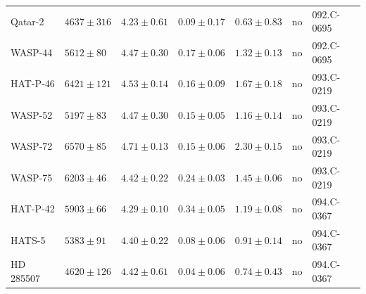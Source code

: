 \documentclass{aa}
\begin{document}
\begin{table}[htb!]
\begin{tabular}{lllllll}
      Qatar-2     &  $4637 \pm 316$      &  $4.23 \pm 0.61$    &  $ 0.09 \pm 0.17$    &  $0.63 \pm 0.83$             &             no              &  092.C-0695                                                                                                              \\
      WASP-44     &  $5612 \pm  80$      &  $4.47 \pm 0.30$    &  $ 0.17 \pm 0.06$    &  $1.32 \pm 0.13$             &             no              &  092.C-0695                                                                                                              \\
     HAT-P-46     &  $6421 \pm 121$      &  $4.53 \pm 0.14$    &  $ 0.16 \pm 0.09$    &  $1.67 \pm 0.18$             &             no              &  093.C-0219                                                                                                              \\
      WASP-52     &  $5197 \pm  83$      &  $4.47 \pm 0.30$    &  $ 0.15 \pm 0.05$    &  $1.16 \pm 0.14$             &             no              &  093.C-0219                                                                                                              \\
      WASP-72     &  $6570 \pm  85$      &  $4.71 \pm 0.13$    &  $ 0.15 \pm 0.06$    &  $2.30 \pm 0.15$             &             no              &  093.C-0219                                                                                                              \\
      WASP-75     &  $6203 \pm  46$      &  $4.42 \pm 0.22$    &  $ 0.24 \pm 0.03$    &  $1.45 \pm 0.06$             &             no              &  093.C-0219                                                                                                              \\
     HAT-P-42     &  $5903 \pm  66$      &  $4.29 \pm 0.10$    &  $ 0.34 \pm 0.05$    &  $1.19 \pm 0.08$             &             no              &  094.C-0367                                                                                                              \\
       HATS-5     &  $5383 \pm  91$      &  $4.40 \pm 0.22$    &  $ 0.08 \pm 0.06$    &  $0.91 \pm 0.14$             &             no              &  094.C-0367                                                                                                              \\
    HD 285507     &  $4620 \pm 126$      &  $4.42 \pm 0.61$    &  $ 0.04 \pm 0.06$    &  $0.74 \pm 0.43$             &             no              &  094.C-0367                                                                                                              \\

\end{tabular}
\end{table}
\end{document}
